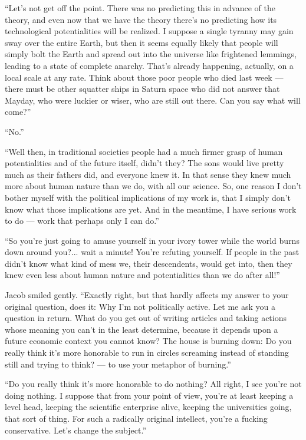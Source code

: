 \documentclass[english,11pt,letterpaper,onecolumn]{scrbook}
\begin{document}
	``Let's not get off the point.  There was no predicting this in advance of the theory, and even now that we have the theory there's no predicting how its technological potentialities will be realized.  I suppose a single tyranny may gain sway over the entire Earth, but then it seems equally likely that people will simply bolt the Earth and spread out into the universe like frightened lemmings, leading to a state of complete anarchy.  That's already happening, actually, on a local scale at any rate.  Think about those poor people who died last week --- there must be other squatter ships in Saturn space who did not answer that Mayday, who were luckier or wiser, who are still out there.  Can you say what will come?''

	``No.''

	``Well then, in traditional societies people had a much firmer grasp of human potentialities and of the future itself, didn't they?  The sons would live pretty much as their fathers did, and everyone knew it.  In that sense they knew much more about human nature than we do, with all our science.  So, one reason I don't bother myself with the political implications of my work is, that I simply don't know what those implications are yet.  And in the meantime, I have serious work to do --- work that perhaps only I can do.''

	``So you're just going to amuse yourself in your ivory tower while the world burns down around you?... wait a minute!  You're refuting yourself.  If people in the past didn't know what kind of mess we, their descendents, would get into, then they knew even less about human nature and potentialities than we do after all!''

	Jacob smiled gently.  ``Exactly right, but that hardly affects my answer to your original question, does it:  Why I'm not politically active.  Let me ask you a question in return.  What do you get out of writing articles and taking actions whose meaning you can't in the least determine, because it depends upon a future economic context you cannot know?  The house is burning down:  Do you really think it's more honorable to run in circles screaming instead of standing still and trying to think? --- to use your metaphor of burning.''

	``Do you really think it's more honorable to do nothing?  All right, I see you're not doing nothing.  I suppose that from your point of view, you're at least keeping a level head, keeping the scientific enterprise alive, keeping the universities going, that sort of thing.  For such a radically original intellect, you're a fucking conservative.  Let's change the subject.''
\end{document}
